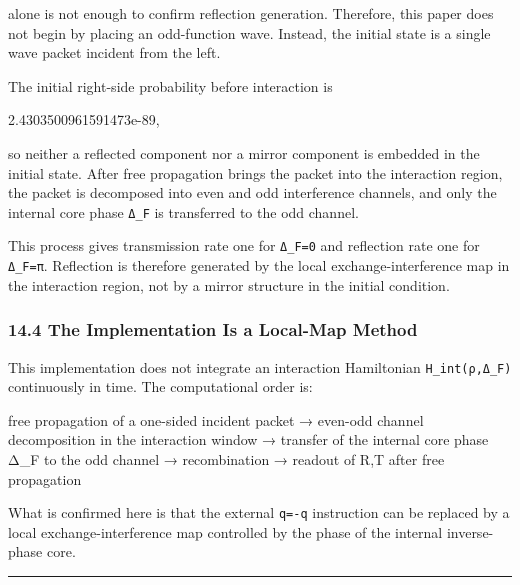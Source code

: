 \documentclass[
  a4paper,
]{article}
\newenvironment{Shaded}{}{}
\newcommand{\NormalTok}[1]{#1}
\begin{document}
alone is not enough to confirm reflection generation. Therefore, this
paper does not begin by placing an odd-function wave. Instead, the
initial state is a single wave packet incident from the left.

The initial right-side probability before interaction is

\begin{Shaded}
\begin{Highlighting}[]
\NormalTok{2.4303500961591473e{-}89,}
\end{Highlighting}
\end{Shaded}

so neither a reflected component nor a mirror component is embedded in
the initial state. After free propagation brings the packet into the
interaction region, the packet is decomposed into even and odd
interference channels, and only the internal core phase \texttt{Δ\_F} is
transferred to the odd channel.

This process gives transmission rate one for \texttt{Δ\_F=0} and
reflection rate one for \texttt{Δ\_F=π}. Reflection is therefore
generated by the local exchange-interference map in the interaction
region, not by a mirror structure in the initial condition.

\subsubsection{14.4 The Implementation Is a Local-Map
Method}\label{the-implementation-is-a-local-map-method}

This implementation does not integrate an interaction Hamiltonian
\texttt{H\_int(ρ,Δ\_F)} continuously in time. The computational order
is:

\begin{Shaded}
\begin{Highlighting}[]
\NormalTok{free propagation of a one{-}sided incident packet}
\NormalTok{→ even{-}odd channel decomposition in the interaction window}
\NormalTok{→ transfer of the internal core phase Δ\_F to the odd channel}
\NormalTok{→ recombination}
\NormalTok{→ readout of R,T after free propagation}
\end{Highlighting}
\end{Shaded}

What is confirmed here is that the external \texttt{q=-q} instruction
can be replaced by a local exchange-interference map controlled by the
phase of the internal inverse-phase core.

\begin{center}\rule{0.5\linewidth}{0.5pt}\end{center}
\end{document}
